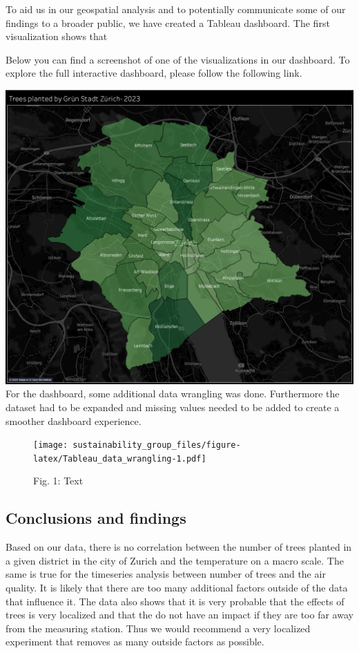 \documentclass[
]{article}
\begin{document}
To aid us in our geospatial analysis and to potentially communicate some
of our findings to a broader public, we have created a Tableau
dashboard. The first visualization shows that

Below you can find a screenshot of one of the visualizations in our
dashboard. To explore the full interactive dashboard, please follow the
following link.

\includegraphics{../images/tableau_trees_total.png}\\
For the dashboard, some additional data wrangling was done. Furthermore
the dataset had to be expanded and missing values needed to be added to
create a smoother dashboard experience.

\begin{figure}
\centering
\texttt{[image: sustainability\_group\_files/figure-latex/Tableau\_data\_wrangling-1.pdf]}
\caption{Fig. 1: Text}
\end{figure}

\hypertarget{conclusions-and-findings}{%
\subsection{Conclusions and findings}\label{conclusions-and-findings}}

Based on our data, there is no correlation between the number of trees
planted in a given district in the city of Zurich and the temperature on
a macro scale. The same is true for the timeseries analysis between
number of trees and the air quality. It is likely that there are too
many additional factors outside of the data that influence it. The data
also shows that it is very probable that the effects of trees is very
localized and that the do not have an impact if they are too far away
from the measuring station. Thus we would recommend a very localized
experiment that removes as many outside factors as possible.
\end{document}
